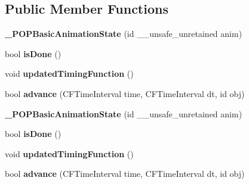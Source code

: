 \subsection*{Public Member Functions}
\begin{DoxyCompactItemize}
\item 
\mbox{\label{struct___p_o_p_basic_animation_state_ae805f1a11116f9146c51468b56a6175b}} 
{\bfseries \+\_\+\+P\+O\+P\+Basic\+Animation\+State} (id \+\_\+\+\_\+unsafe\+\_\+unretained anim)
\item 
\mbox{\label{struct___p_o_p_basic_animation_state_a8ce818672401148b1f64a87c39f40272}} 
bool {\bfseries is\+Done} ()
\item 
\mbox{\label{struct___p_o_p_basic_animation_state_a24b0df425a13915b37bf68dc326342bc}} 
void {\bfseries updated\+Timing\+Function} ()
\item 
\mbox{\label{struct___p_o_p_basic_animation_state_ad78d6faca257d9a7087e4cd9c9a4f24b}} 
bool {\bfseries advance} (C\+F\+Time\+Interval time, C\+F\+Time\+Interval dt, id obj)
\item 
\mbox{\label{struct___p_o_p_basic_animation_state_ae805f1a11116f9146c51468b56a6175b}} 
{\bfseries \+\_\+\+P\+O\+P\+Basic\+Animation\+State} (id \+\_\+\+\_\+unsafe\+\_\+unretained anim)
\item 
\mbox{\label{struct___p_o_p_basic_animation_state_a8ce818672401148b1f64a87c39f40272}} 
bool {\bfseries is\+Done} ()
\item 
\mbox{\label{struct___p_o_p_basic_animation_state_a24b0df425a13915b37bf68dc326342bc}} 
void {\bfseries updated\+Timing\+Function} ()
\item 
\mbox{\label{struct___p_o_p_basic_animation_state_ad78d6faca257d9a7087e4cd9c9a4f24b}} 
bool {\bfseries advance} (C\+F\+Time\+Interval time, C\+F\+Time\+Interval dt, id obj)
\end{DoxyCompactItemize}
